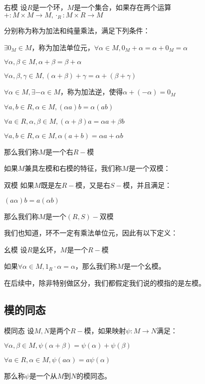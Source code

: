 \documentclass[12pt, a4paper, oneside, UTF8]{ctexbook}
\begin{document}
			\begin{defn}{右模}{}
				设$R$是一个环，$M$是一个集合，如果存在两个运算$+ : M \times M \rightarrow M,\cdot_R : M \times R \rightarrow M$
				
				分别称为称为加法和纯量乘法，满足下列条件：

				 $\exists 0_M \in M$，称为加法单位元，$\forall \alpha \in M,0_M + \alpha =\alpha +0_M=\alpha $

				 $\forall \alpha,\beta  \in M,\alpha +\beta =\beta +\alpha $

				 $\forall \alpha,\beta,\gamma  \in M,(\alpha +\beta )+\gamma =\alpha +(\beta +\gamma )$

				 $\forall \alpha \in M,\exists -\alpha \in M$，称为加法逆，使得$\alpha +(-\alpha )=0_M$

				 $\forall a,b \in R,\alpha \in M,(\alpha a)b=\alpha (ab)$

				 $\forall a \in R,\alpha ,\beta \in M,(\alpha +\beta )a=\alpha a+\beta b$

				 $\forall a,b \in R,\alpha \in M,\alpha (a+b)=\alpha a+\alpha b$

				那么我们称$M$是一个右$R-$模
			\end{defn}
			如果$M$兼具左模和右模的特征，我们称$M$是一个双模：
			\begin{defn}{双模}{}
				如果$M$既是左$R-$模，又是右$S-$模，并且满足：

				$(a \alpha )b=a(\alpha b)$

				那么我们称$M$是一个$(R,S)-$双模
			\end{defn}
			我们也知道，环不一定有乘法单位元，因此有以下定义：
			\begin{defn}{幺模}{}
				设$R$是幺环，$M$是一个$R-$模

				如果$\forall \alpha \in M,1_R \cdot \alpha =\alpha $，那么我们称$M$是一个幺模。
			\end{defn}
			在后续中，除非特别做区分，我们都假定我们说的模指的是左模。
		\subsection{模的同态}
			\begin{defn}{模同态}{}
				设$M,N$是两个$R-$模，如果映射$\psi  : M \rightarrow N$满足：

				$\forall \alpha ,\beta  \in M,\psi (\alpha +\beta )=\psi (\alpha )+\psi (\beta )$

				$\forall a \in R,\alpha  \in M,\psi (a\alpha )=a\psi (\alpha )$

				那么称$\psi $是一个从$M$到$N$的模同态。
			\end{defn}
\ifx\allfiles\undefined
\end{document}
